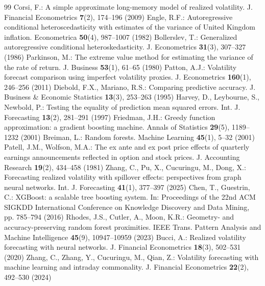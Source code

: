 \documentclass[runningheads,a4paper]{llncs}
\begin{document}
\begin{thebibliography}{99}
 Corsi, F.: A simple approximate long-memory model of realized volatility. J. Financial Econometrics \textbf{7}(2), 174--196 (2009)
 Engle, R.F.: Autoregressive conditional heteroscedasticity with estimates of the variance of United Kingdom inflation. Econometrica \textbf{50}(4), 987--1007 (1982)
 Bollerslev, T.: Generalized autoregressive conditional heteroskedasticity. J. Econometrics \textbf{31}(3), 307--327 (1986)
 Parkinson, M.: The extreme value method for estimating the variance of the rate of return. J. Business \textbf{53}(1), 61--65 (1980)
 Patton, A.J.: Volatility forecast comparison using imperfect volatility proxies. J. Econometrics \textbf{160}(1), 246--256 (2011)
 Diebold, F.X., Mariano, R.S.: Comparing predictive accuracy. J. Business \& Economic Statistics \textbf{13}(3), 253--263 (1995)
 Harvey, D., Leybourne, S., Newbold, P.: Testing the equality of prediction mean squared errors. Int. J. Forecasting \textbf{13}(2), 281--291 (1997)
 Friedman, J.H.: Greedy function approximation: a gradient boosting machine. Annals of Statistics \textbf{29}(5), 1189--1232 (2001)
 Breiman, L.: Random forests. Machine Learning \textbf{45}(1), 5--32 (2001)
 Patell, J.M., Wolfson, M.A.: The ex ante and ex post price effects of quarterly earnings announcements reflected in option and stock prices. J. Accounting Research \textbf{19}(2), 434--458 (1981)
 Zhang, C., Pu, X., Cucuringu, M., Dong, X.: Forecasting realized volatility with spillover effects: perspectives from graph neural networks. Int. J. Forecasting \textbf{41}(1), 377--397 (2025)
 Chen, T., Guestrin, C.: XGBoost: a scalable tree boosting system. In: Proceedings of the 22nd ACM SIGKDD International Conference on Knowledge Discovery and Data Mining, pp. 785--794 (2016)
 Rhodes, J.S., Cutler, A., Moon, K.R.: Geometry- and accuracy-preserving random forest proximities. IEEE Trans. Pattern Analysis and Machine Intelligence \textbf{45}(9), 10947--10959 (2023)
 Bucci, A.: Realized volatility forecasting with neural networks. J. Financial Econometrics \textbf{18}(3), 502--531 (2020)
 Zhang, C., Zhang, Y., Cucuringu, M., Qian, Z.: Volatility forecasting with machine learning and intraday commonality. J. Financial Econometrics \textbf{22}(2), 492--530 (2024)

\end{thebibliography}
\end{document}
